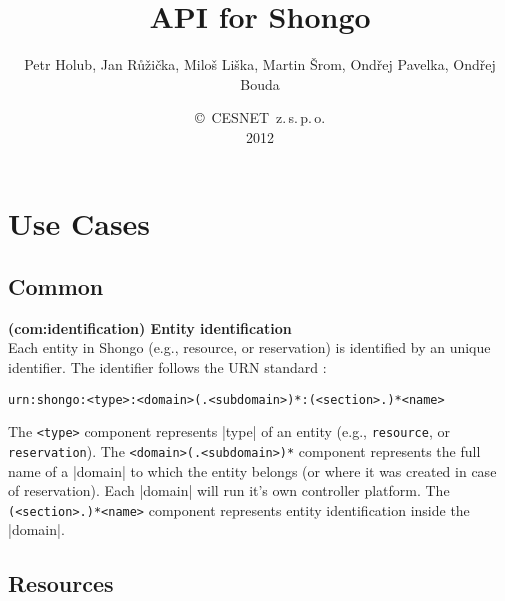 \documentclass[a4paper]{report}
\makeatletter
\newcommand{\ApiValue}[1]{\verb|#1|}
\newcounter{UCcounter}
\newenvironment{UseCases}%
	{\begin{list}{\textbf{UC-\arabic{UCcounter}}}{\@nmbrlisttrue\def\@listctr{UCcounter}}}%
	{\end{list}}
\newcommand{\UClabel}[1]{\label{UC:#1}}
\newcommand{\UseCase}[2]{\item\UClabel{#2} \textbf{(#2) #1}\\ \nopagebreak}
\makeatother
\begin{document}
\title{API for Shongo}
\author{Petr Holub, Jan Růžička, Miloš Liška, Martin Šrom, Ondřej Pavelka, Ondřej Bouda}
\date{\copyright~CESNET~z.\,s.\,p.\,o.\\2012}

\maketitle

\tableofcontents

\chapter{Use Cases}

\section{Common}

\begin{UseCases}

\UseCase{Entity identification}{com:identification}
Each entity in Shongo (e.g., resource, or reservation) is identified by an unique identifier. 
The identifier follows the URN standard \cite{rfc2141}:
\begin{verbatim}
urn:shongo:<type>:<domain>(.<subdomain>)*:(<section>.)*<name>
\end{verbatim}
The \ApiValue{<type>} component represents |type| of an entity (e.g., \ApiValue{resource}, or \ApiValue{reservation}). The \ApiValue{<domain>(.<subdomain>)*} component represents the full name of a |domain| to which the entity belongs (or where it was created in case of reservation). Each |domain| will run it's own controller platform. The \ApiValue{(<section>.)*<name>} component represents entity identification inside the |domain|.

\end{UseCases}


\section{Resources}
\end{document}
